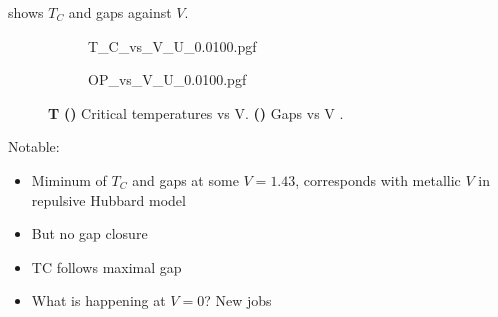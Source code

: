 \documentclass[../notes.tex]{subfiles}
\begin{document}
 shows \(T_C\) and gaps against \(V\).
\begin{figure}[H]
	\centering
	\begin{subfigure}[b]{0.5\textwidth}
		\centering
		\caption{\hfill\null}\label{sfig:decorated graphene critical temperatures vs V}
		{T_C_vs_V_U_0.0100.pgf}
	\end{subfigure}%
	\begin{subfigure}[b]{0.5\textwidth}
		\centering
		\caption{\hfill\null}\label{sfig:decorated graphene gaps vs V}
		{OP_vs_V_U_0.0100.pgf}
	\end{subfigure}
	\caption{
		\textbf{T} \textbf{()} Critical temperatures vs V. \textbf{()} Gaps vs V .
	} 
	\label{fig:decorated Graphene TC and gaps against V}
\end{figure}
Notable:
\begin{itemize}
	\item Miminum of \(T_C\) and gaps at some \(V = 1.43\), corresponds with metallic \(V\) in repulsive Hubbard model
	\item But no gap closure
	\item TC follows maximal gap
	\item What is happening at \(V = 0\)? New jobs 
\end{itemize}

\end{document}
